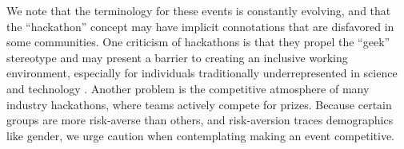 We note that the terminology for these events is constantly evolving, and that the ``hackathon'' concept may have implicit connotations that are disfavored in some communities.
One criticism of hackathons is that they propel the ``geek'' stereotype and may present a barrier to creating an inclusive working environment, especially for individuals traditionally underrepresented in science and technology \cite{Decker2015}.
Another problem is the competitive atmosphere of many industry hackathons, where teams actively compete for prizes.
Because certain groups are more risk-averse than others, and risk-aversion traces demographics like gender, we urge caution when contemplating making an event competitive.